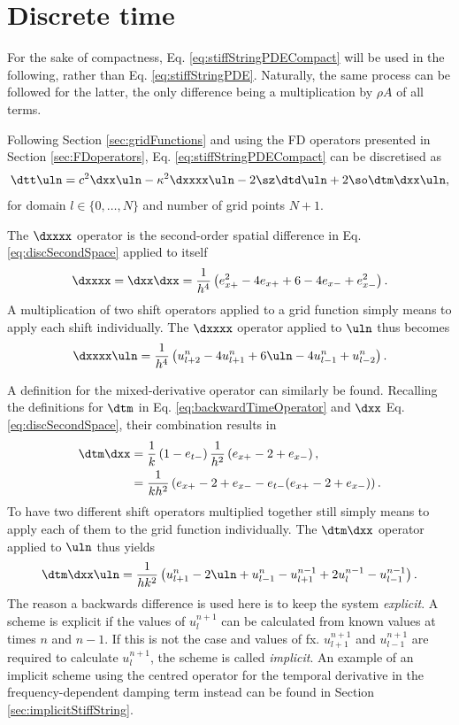 \section{Discrete time}\label{sec:stiffStringDiscrete}
For the sake of compactness, Eq. \eqref{eq:stiffStringPDECompact} will be used in the following, rather than Eq. \eqref{eq:stiffStringPDE}. Naturally, the same process can be followed for the latter, the only difference being a multiplication by $\rho A$ of all terms.

Following Section \ref{sec:gridFunctions} and using the FD operators presented in Section \ref{sec:FDoperators}, Eq. \eqref{eq:stiffStringPDECompact} can be discretised as 
\begin{equation}\label{eq:stiffStringFDS}
    \dtt \uln = c^2 \dxx \uln - \kappa^2 \dxxxx \uln - 2 \sz \dtd \uln + 2 \so\dtm\dxx \uln,
\end{equation}
for domain $l\in\{0, \hdots, N\}$ and number of grid points $N+1$. 

The $\dxxxx$ operator is the second-order spatial difference in Eq. \eqref{eq:discSecondSpace} applied to itself
\begin{equation}\label{eq:dxxxx}
    \dxxxx = \dxx\dxx = \frac{1}{h^4}\left(e_{x+}^2 - 4e_{x+}+6 - 4e_{x-}+e_{x-}^2\right).
\end{equation} 
A multiplication of two shift operators applied to a grid function simply means to apply each shift individually. The $\dxxxx$ operator applied to $\uln$ thus becomes
\begin{equation}
    \dxxxx\uln = \frac{1}{h^4}\left(u_{l+2}^n - 4u_{l+1}^n+6\uln - 4u_{l-1}^n+u_{l-2}^n\right).
\end{equation}

A definition for the mixed-derivative operator can similarly be found.
Recalling the definitions for $\dtm$ in Eq. \eqref{eq:backwardTimeOperator} and $\dxx$ Eq. \eqref{eq:discSecondSpace}, their combination results in
\begin{align}
    \dtm\dxx &= \frac{1}{k}\left(1-e_{t-}\right)\frac{1}{h^2}\left(e_{x+}-2+e_{x-}\right),\nonumber \\
    &= \frac{1}{kh^2}\left(e_{x+}-2+e_{x-} - e_{t-}(e_{x+}-2+e_{x-})\right).
\end{align}
To have two different shift operators multiplied together still simply means to apply each of them to the grid function individually. The $\dtm\dxx$ operator applied to $\uln$ thus yields
\begin{equation}
    \dtm \dxx \uln = \frac{1}{hk^2}\left(u_{l+1}^n - 2 \uln + u_{l-1}^n - u_{l+1}^{n-1} + 2 u_l^{n-1} - u_{l-1}^{n-1}\right).
\end{equation}
The reason a backwards difference is used here is to keep the system \textit{explicit}. A scheme is explicit if the values of $u_l^{n+1}$ can be calculated from known values at times $n$ and $n-1$. If this is not the case and values of fx. $u_{l+1}^{n+1}$ and $u_{l-1}^{n+1}$ are required to calculate $u_l^{n+1}$, the scheme is called \textit{implicit}. An example of an implicit scheme using the centred operator for the temporal derivative in the frequency-dependent damping term instead can be found in Section \ref{sec:implicitStiffString}.

